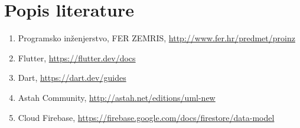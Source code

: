 \chapter*{Popis literature}
		
		\begin{enumerate}
			
			
			\item  Programsko inženjerstvo, FER ZEMRIS, \url{http://www.fer.hr/predmet/proinz}
			
			\item Flutter, \url{https://flutter.dev/docs}
			
			\item Dart, \url{https://dart.dev/guides}
			
			\item  Astah Community, \url{http://astah.net/editions/uml-new}
			
			\item  Cloud Firebase, \url{https://firebase.google.com/docs/firestore/data-model}
			
			
		\end{enumerate}
		
		 